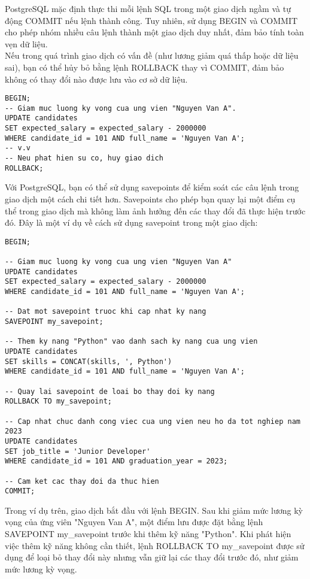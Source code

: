 PostgreSQL mặc định thực thi mỗi lệnh SQL trong một giao dịch ngầm và tự động COMMIT nếu lệnh thành công. Tuy nhiên, sử dụng BEGIN và COMMIT cho phép nhóm nhiều câu lệnh thành một giao dịch duy nhất, đảm bảo tính toàn vẹn dữ liệu.\\

Nếu trong quá trình giao dịch có vấn đề (như lương giảm quá thấp hoặc dữ liệu sai), bạn có thể hủy bỏ bằng lệnh ROLLBACK thay vì COMMIT, đảm bảo không có thay đổi nào được lưu vào cơ sở dữ liệu.\\

\begin{lstlisting}
BEGIN;
-- Giam muc luong ky vong cua ung vien "Nguyen Van A".
UPDATE candidates 
SET expected_salary = expected_salary - 2000000
WHERE candidate_id = 101 AND full_name = 'Nguyen Van A';
-- v.v
-- Neu phat hien su co, huy giao dich
ROLLBACK;
\end{lstlisting}

Với PostgreSQL, bạn có thể sử dụng savepoints để kiểm soát các câu lệnh trong giao dịch một cách chi tiết hơn. Savepoints cho phép bạn quay lại một điểm cụ thể trong giao dịch mà không làm ảnh hưởng đến các thay đổi đã thực hiện trước đó. Đây là một ví dụ về cách sử dụng savepoint trong một giao dịch:
\begin{lstlisting}
BEGIN;

-- Giam muc luong ky vong cua ung vien "Nguyen Van A"
UPDATE candidates 
SET expected_salary = expected_salary - 2000000
WHERE candidate_id = 101 AND full_name = 'Nguyen Van A';

-- Dat mot savepoint truoc khi cap nhat ky nang
SAVEPOINT my_savepoint;

-- Them ky nang "Python" vao danh sach ky nang cua ung vien
UPDATE candidates 
SET skills = CONCAT(skills, ', Python')
WHERE candidate_id = 101 AND full_name = 'Nguyen Van A';

-- Quay lai savepoint de loai bo thay doi ky nang
ROLLBACK TO my_savepoint;

-- Cap nhat chuc danh cong viec cua ung vien neu ho da tot nghiep nam 2023
UPDATE candidates 
SET job_title = 'Junior Developer'
WHERE candidate_id = 101 AND graduation_year = 2023;

-- Cam ket cac thay doi da thuc hien
COMMIT;
\end{lstlisting}

Trong ví dụ trên, giao dịch bắt đầu với lệnh BEGIN. Sau khi giảm mức lương kỳ vọng của ứng viên "Nguyen Van A", một điểm lưu được đặt bằng lệnh SAVEPOINT my\_savepoint trước khi thêm kỹ năng "Python". Khi phát hiện việc thêm kỹ năng không cần thiết, lệnh ROLLBACK TO my\_savepoint được sử dụng để loại bỏ thay đổi này nhưng vẫn giữ lại các thay đổi trước đó, như giảm mức lương kỳ vọng.\\

